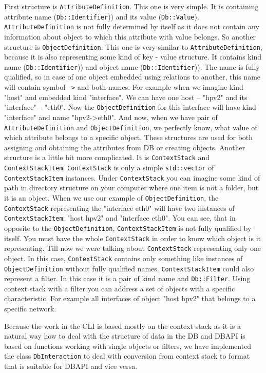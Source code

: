 \documentclass[deska]{subfiles}
\begin{document}
First structure is {\tt AttributeDefinition}. This one is very simple. It is containing attribute name ({\tt Db::Identifier}))
and its value ({\tt Db::Value}). {\tt AttributeDefinition} is not fully determined by itself as it 
does not contain any information about object to which this attribute with value belongs. So another structure is
{\tt ObjectDefinition}. This one is very similar to {\tt AttributeDefinition}, because it is also representing some kind of 
key - value structure. It contains kind name ({\tt Db::Identifier})) and object name ({\tt Db::Identifier})). The name 
is fully qualified, so in case of one object embedded using relations to another, this name will contain symbol {\tt ->} 
and both names. For example when we imagine kind "host" and embedded kind "interface". We can have one host -- "hpv2" 
and its "interface" -- "eth0". Now the {\tt ObjectDefinition} for this interface will have kind "interface" and name 
"hpv2->eth0". And now, when we have pair of {\tt AttributeDefinition} and {\tt ObjectDefinition}, we perfectly know, 
what value of which attribute belongs to a specific object. These structures are used for both assigning and obtaining 
the attributes from DB or creating objects. Another structure is a little bit more complicated. It is {\tt ContextStack}
and {\tt ContextStackItem}. {\tt ContextStack} is only a simple {\tt std::vector} of {\tt ContextStackItem} instances.
Under {\tt ContextStack} you can imagine some kind of path in directory structure on your computer where one item is not
a folder, but it is an object. When we use our example of {\tt ObjectDefinition}, the {\tt ContextStack} representing
the "interface eth0" will have two instances of {\tt ContextStackItem}: "host hpv2" and "interface eth0". You can see,
that in opposite to the {\tt ObjectDefinition}, {\tt ContextStackItem} is not fully qualified by itself. You must have
the whole {\tt ContextStack} in order to know which object is it representing. Till now we were talking about
{\tt ContextStack} representing only one object. In this case, {\tt ContextStack} contains only something like
instances of {\tt ObjectDefinition} without fully qualified names. {\tt ContextStackItem} could also represent a filter.
In this case it is a pair of kind name and {\tt Db::Filter}. Using context stack with a filter you can address a set of
objects with a specific characteristic. For example all interfaces of object "host hpv2" that belongs to a specific
network.

Because the work in the CLI is based mostly on the context stack as it is a natural way how to deal with the structure
of data in the DB and DBAPI is based on functions working with single objects or filters, we have implemented the
class {\tt DbInteraction} to deal with conversion from context stack to format that is suitable for DBAPI and vice versa.
\end{document}
